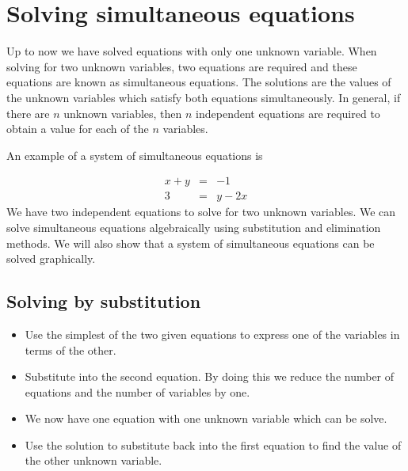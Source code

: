 \section{Solving simultaneous equations}

Up to now we have solved equations with only one unknown variable. 
When solving for two unknown variables, two equations are required and these equations are known as simultaneous equations. 
The solutions are the values of the unknown variables which satisfy both equations simultaneously. In general, if there are $n$ unknown variables, then $n$ independent equations are required to obtain a value for each of the $n$ variables.\par 
An example of a system of simultaneous equations is

\begin{equation*}
\begin{array}{rcl} x+y&=&-1 \\ 
 3&=&y-2x
\end{array}
\end{equation*}
We have two independent equations to solve for two unknown variables. We can solve simultaneous equations algebraically using substitution and elimination methods. We will also show that a system of simultaneous equations can be solved graphically.\par 

\subsection*{Solving by substitution}
\begin{itemize}
 \item Use the simplest of the two given equations to express one of the variables in terms of the other.
\item Substitute into the second equation. By doing this we reduce the number of equations and the number of variables by one.
\item We now have one equation with one unknown variable which can be solve.
\item Use the solution to substitute back into the first equation to find the value of the other unknown variable.
\end{itemize}

